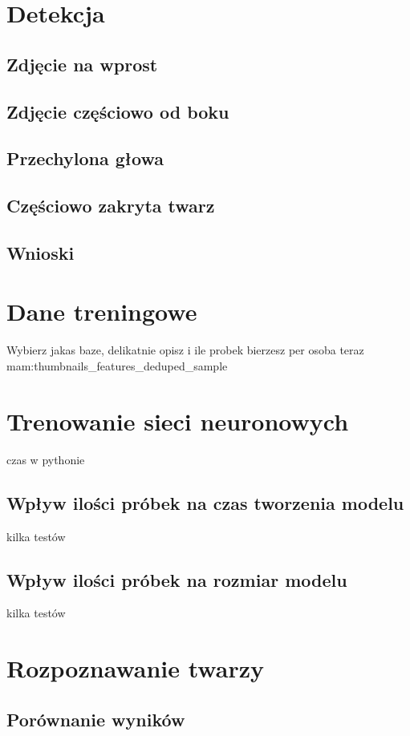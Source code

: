 \section{Detekcja}
\subsection{Zdjęcie na wprost}
\subsection{Zdjęcie częściowo od boku}
\subsection{Przechylona głowa}
\subsection{Częściowo zakryta twarz}
\subsection{Wnioski}

\section{Dane treningowe}
Wybierz jakas baze, delikatnie opisz i ile probek bierzesz per osoba
teraz mam:thumbnails_features_deduped_sample

\section{Trenowanie sieci neuronowych}
 czas w pythonie
\subsection{Wpływ ilości próbek na czas tworzenia modelu}
kilka testów
\subsection{Wpływ ilości próbek na rozmiar modelu}
kilka testów

\section{Rozpoznawanie twarzy}
\subsection{Porównanie wyników}

